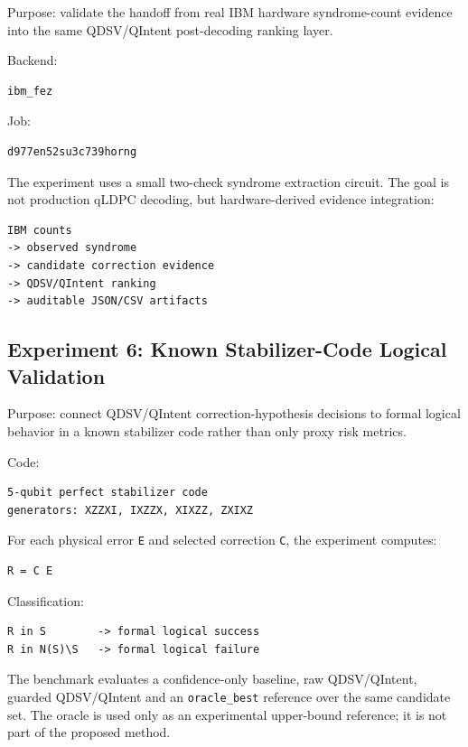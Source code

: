 \documentclass[11pt]{article}
\begin{document}
Purpose: validate the handoff from real IBM hardware syndrome-count evidence into the same QDSV/QIntent post-decoding ranking layer.


Backend:


\begin{lstlisting}
ibm_fez
\end{lstlisting}

Job:


\begin{lstlisting}
d977en52su3c739horng
\end{lstlisting}

The experiment uses a small two-check syndrome extraction circuit. The goal is not production qLDPC decoding, but hardware-derived evidence integration:


\begin{lstlisting}
IBM counts
-> observed syndrome
-> candidate correction evidence
-> QDSV/QIntent ranking
-> auditable JSON/CSV artifacts
\end{lstlisting}

\subsection{Experiment 6: Known Stabilizer-Code Logical Validation}

Purpose: connect QDSV/QIntent correction-hypothesis decisions to formal logical behavior in a known stabilizer code rather than only proxy risk metrics.


Code:


\begin{lstlisting}
5-qubit perfect stabilizer code
generators: XZZXI, IXZZX, XIXZZ, ZXIXZ
\end{lstlisting}

For each physical error \texttt{E} and selected correction \texttt{C}, the experiment computes:


\begin{lstlisting}
R = C E
\end{lstlisting}

Classification:


\begin{lstlisting}
R in S        -> formal logical success
R in N(S)\S   -> formal logical failure
\end{lstlisting}

The benchmark evaluates a confidence-only baseline, raw QDSV/QIntent, guarded QDSV/QIntent and an \texttt{oracle\_best} reference over the same candidate set. The oracle is used only as an experimental upper-bound reference; it is not part of the proposed method.
\end{document}

